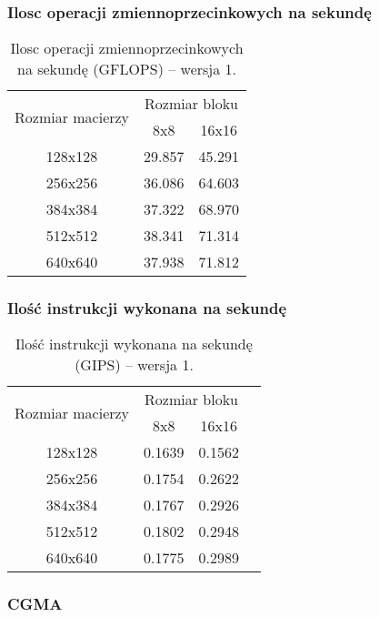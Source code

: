 \subsubsection{Ilosc operacji zmiennoprzecinkowych na sekundę}

\begin{table}[H]
\centering
\begin{tabular}{|c|c|c|}
\hline
\multirow{2}{*}{Rozmiar macierzy} & \multicolumn{2}{c|}{Rozmiar bloku} \\ \cline{2-3}
& 8x8 & 16x16 \\ \hline
128x128 & 29.857 & 45.291 \\ \hline
256x256 & 36.086 & 64.603 \\ \hline
384x384 & 37.322 & 68.970 \\ \hline
512x512 & 38.341 & 71.314 \\ \hline
640x640 & 37.938 & 71.812 \\ \hline
\end{tabular}
\caption{Ilosc operacji zmiennoprzecinkowych na sekundę (GFLOPS) -- wersja 1.}
\end{table}

\subsubsection{Ilość instrukcji wykonana na sekundę}

\begin{table}[H]
\centering
\begin{tabular}{|c|c|c|c|}
\hline
\multirow{2}{*}{Rozmiar macierzy} & \multicolumn{2}{c|}{Rozmiar bloku} \\ \cline{2-3}
& 8x8 & 16x16 \\ \hline
128x128 & 0.1639 & 0.1562 \\ \hline
256x256 & 0.1754 & 0.2622 \\ \hline
384x384 & 0.1767 & 0.2926 \\ \hline
512x512 & 0.1802 & 0.2948 \\ \hline
640x640 & 0.1775 & 0.2989 \\ \hline
\end{tabular}
\caption{Ilość instrukcji wykonana na sekundę (GIPS) -- wersja 1.}
\end{table}

\subsubsection{CGMA}

